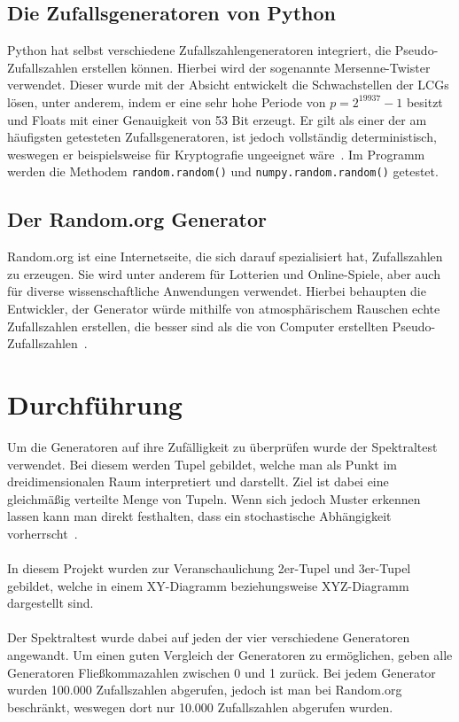 \documentclass[12pt]{article}
\begin{document}
    \subsection{Die Zufallsgeneratoren von Python}\label{subsec:die-zufallsgeneratoren-von-python}
    Python hat selbst verschiedene Zufallszahlengeneratoren integriert, die Pseudo-Zufallszahlen erstellen können.
    Hierbei wird der sogenannte Mersenne-Twister verwendet.
    Dieser wurde mit der Absicht entwickelt die Schwachstellen der LCGs lösen, unter anderem,
    indem er eine sehr hohe Periode von $p=2^{19937}-1$ besitzt und Floats mit einer Genauigkeit von 53 Bit erzeugt.
    Er gilt als einer der am häufigsten getesteten Zufallsgeneratoren, ist jedoch vollständig deterministisch,
    weswegen er beispielsweise für Kryptografie ungeeignet wäre~\cite{python-random,mersenne-twister}.
    Im Programm werden die Methodem \texttt{random.random()} und \texttt{numpy.random.random()} getestet.

    \vfill

    \subsection{Der Random.org Generator}\label{subsec:der-random.org-generator}
    Random.org ist eine Internetseite, die sich darauf spezialisiert hat, Zufallszahlen zu erzeugen.
    Sie wird unter anderem für Lotterien und Online-Spiele, aber auch für diverse wissenschaftliche
    Anwendungen verwendet.
    Hierbei behaupten die Entwickler, der Generator würde mithilfe von atmosphärischem
    Rauschen echte Zufallszahlen erstellen, die besser sind als die von Computer erstellten Pseudo-Zufallszahlen~\cite{random-org}.

    \vfill

    \section{Durchführung}\label{sec:Durchfuehrung}
    Um die Generatoren auf ihre Zufälligkeit zu überprüfen wurde der Spektraltest verwendet.
    Bei diesem werden Tupel gebildet, welche man als Punkt im dreidimensionalen Raum interpretiert und darstellt.
    Ziel ist dabei eine gleichmäßig verteilte Menge von Tupeln.
    Wenn sich jedoch Muster erkennen lassen kann man direkt festhalten, dass ein stochastische Abhängigkeit vorherrscht~\cite{spektraltest}.
    \\ \\
    In diesem Projekt wurden zur Veranschaulichung 2er-Tupel und 3er-Tupel gebildet,
    welche in einem XY-Diagramm beziehungsweise XYZ-Diagramm dargestellt sind.
    \\ \\
    Der Spektraltest wurde dabei auf jeden der vier verschiedene Generatoren angewandt.
    Um einen guten Vergleich der Generatoren zu ermöglichen, geben alle Generatoren Fließkommazahlen zwischen 0 und 1 zurück.
    Bei jedem Generator wurden 100.000 Zufallszahlen abgerufen, jedoch ist man bei Random.org beschränkt,
    weswegen dort nur 10.000 Zufallszahlen abgerufen wurden.
\end{document}
